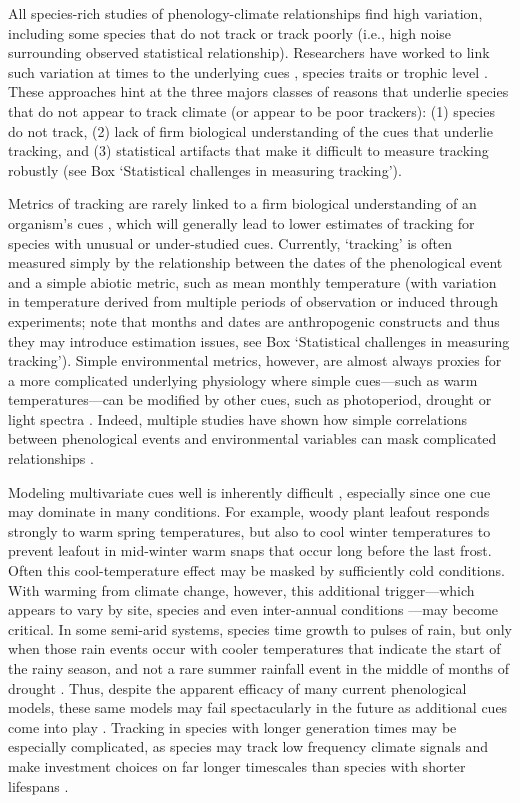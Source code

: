 \documentclass[11pt,letterpaper]{article}
\begin{document}
All species-rich studies of phenology-climate relationships find high variation, including some species that do not track or track poorly (i.e., high noise surrounding observed statistical relationship). Researchers have worked to link such variation at times to the underlying cues \citep[e.g.,][]{Cook:2012pnas}, species traits \citep[e.g.,][]{cohen2018} or trophic level \citep[e.g.,][]{thackeray2016}. These approaches hint at the three majors classes of reasons that underlie species that do not appear to track climate (or appear to be poor trackers): (1) species do not track, (2) lack of firm biological understanding of the cues that underlie tracking, and (3) statistical artifacts that make it difficult to measure tracking robustly (see Box `Statistical challenges in measuring tracking'). 

Metrics of tracking are rarely linked to a firm biological understanding of an organism's cues \citep{chmura2019}, which will generally lead to lower estimates of tracking for species with unusual or under-studied cues. Currently, `tracking' is often measured simply by the relationship between the dates of the phenological event and a simple abiotic metric, such as mean monthly temperature (with variation in temperature derived from multiple periods of observation or induced through experiments; note that months and dates are anthropogenic constructs and thus they may introduce estimation issues, see Box `Statistical challenges in measuring tracking'). Simple environmental metrics, however, are almost always proxies for a more complicated underlying physiology where simple cues---such as warm temperatures---can be modified by other cues, such as photoperiod, drought or light spectra \citep{Bagnall1993,Stinchcombe:2004ec}. Indeed, multiple studies have shown how simple correlations between phenological events and environmental variables can mask complicated relationships \citep{Cook:2012pnas,tansey2017}. 

Modeling multivariate cues well is inherently difficult \citep{chuine2016}, especially since one cue may dominate in many conditions. For example, woody plant leafout responds strongly to warm spring temperatures, but also to cool winter temperatures to prevent leafout in mid-winter warm snaps that occur long before the last frost. Often this cool-temperature effect may be masked by sufficiently cold conditions. With warming from climate change, however, this additional trigger---which appears to vary by site, species and even inter-annual conditions \citep{dennis2003}---may become critical. In some semi-arid systems, species time growth to pulses of rain, but only when those rain events occur with cooler temperatures that indicate the start of the rainy season, and not a rare summer rainfall event in the middle of months of drought \citep{Wainwright:2012tw,wainwright2013}. Thus, despite the apparent efficacy of many current phenological models, these same models may fail spectacularly in the future as additional cues come into play \citep{chuine2016}. Tracking in species with longer generation times may be especially complicated, as species may track low frequency climate signals and make investment choices on far longer timescales than species with shorter lifespans \citep{morris2008}. 
\end{document}
